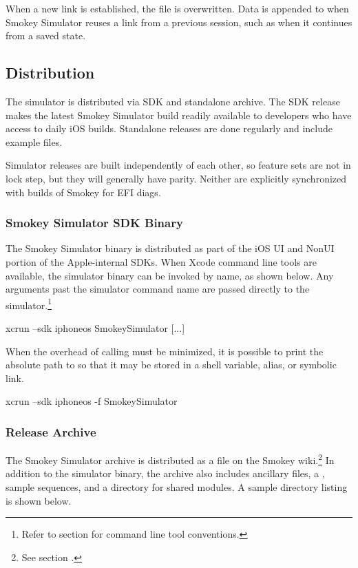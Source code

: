 When a new link is established, the file  is overwritten.  Data
is appended to  when Smokey Simulator reuses a link from a
previous session, such as when it continues from a saved state.

\subsection{Distribution}

The simulator is distributed via SDK and standalone archive.  The SDK release
makes the latest Smokey Simulator build readily available to developers who
have access to daily iOS builds.  Standalone releases are done regularly and
include example files.

Simulator releases are built independently of each other, so feature sets are
not in lock step, but they will generally have parity.  Neither are explicitly
synchronized with builds of Smokey for EFI diags.

\subsubsection{Smokey Simulator SDK Binary}

The Smokey Simulator binary is distributed as part of the iOS UI and NonUI
portion of the Apple-internal SDKs.  When Xcode command line tools are
available, the simulator binary can be invoked by name, as shown below.  Any
arguments past the simulator command name are passed directly to the
simulator.\footnote{Refer to section  for command
line tool conventions.}

\begin{CommandLine}
xcrun --sdk iphoneos SmokeySimulator [...]
\end{CommandLine}

When the overhead of calling  must be minimized, it is possible
to print the absolute path to  so that it may be
stored in a shell variable, alias, or symbolic link.

\begin{CommandLine}
xcrun --sdk iphoneos -f SmokeySimulator
\end{CommandLine}

\subsubsection{Release Archive}

The Smokey Simulator archive is distributed as a  file on the
Smokey wiki.\footnote{See section .}  In
addition to the simulator binary, the archive also includes ancillary files, a
, sample sequences, and a directory for shared modules.  A
sample directory listing is shown below.

